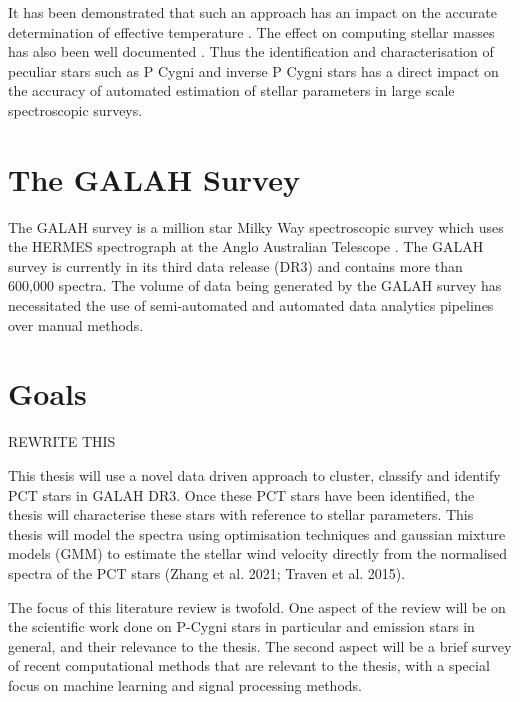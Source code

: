 It has been demonstrated that such an approach has an impact on the accurate determination of effective temperature \cite{cayrel2011halpha}\cite{amarsi2018effective}\cite{giribaldi2019accurate}. The effect on computing stellar masses has also been well documented \cite{ness2016spectroscopic}\cite{bergemann2016gaia}. Thus the identification and characterisation of peculiar stars such as P Cygni and inverse P Cygni stars has a direct impact on the accuracy of automated estimation of stellar parameters in large scale spectroscopic surveys. 

\section{The GALAH Survey}

The GALAH survey is a million star Milky Way spectroscopic survey which uses the HERMES spectrograph at the Anglo Australian Telescope \cite{de2015galah} \cite{buder2021galah+}. The GALAH survey is currently in its third data release (DR3) and contains more than 600,000 spectra. The volume of data being generated by the GALAH survey has necessitated the use of semi-automated and automated data analytics pipelines over manual methods.

\section{Goals}

REWRITE THIS

This thesis will use a novel data driven approach to cluster, classify and identify PCT stars in GALAH DR3. Once these PCT stars have been identified, the thesis will characterise these stars with reference to stellar parameters. This thesis will model the spectra using optimisation techniques and gaussian mixture models (GMM) to estimate the stellar wind velocity directly from the normalised spectra of the PCT stars (Zhang et al. 2021; Traven et al. 2015).

The focus of this literature review is twofold. One aspect of the review will be on the scientific work done on P-Cygni stars in particular and emission stars in general, and their relevance to the thesis. The second aspect will be a brief survey of recent computational methods that are relevant to the thesis, with a special focus on machine learning and signal processing methods. 




